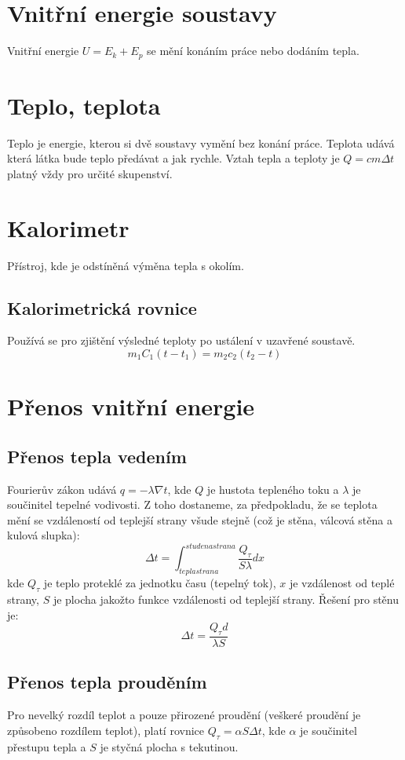\documentclass[titlepage]{report}
\begin{document}
\section{Vnitřní energie soustavy}
Vnitřní energie $U = E_k + E_p$ se mění konáním práce nebo dodáním tepla.
\section{Teplo, teplota}
Teplo je energie, kterou si dvě soustavy vymění bez konání práce. Teplota udává která látka bude teplo předávat a jak rychle. Vztah tepla a teploty je $Q = cm\Delta t$ platný vždy pro určité skupenství.
\section{Kalorimetr}
Přístroj, kde je odstíněná výměna tepla s okolím.
\subsection{Kalorimetrická rovnice}
Používá se pro zjištění výsledné teploty po ustálení v uzavřené soustavě.\\
\begin{equation}
m_1C_1(t-t_1) = m_2c_2(t_2-t)
\end{equation}
\section{Přenos vnitřní energie}
\subsection{Přenos tepla vedením}
Fourierův zákon udává $q = -\lambda \nabla t$, kde $Q$ je hustota tepleného toku a $\lambda$ je součinitel tepelné vodivosti. Z toho dostaneme, za předpokladu, že se teplota mění se vzdáleností od teplejší strany všude stejně (což je stěna, válcová stěna a kulová slupka):
\begin{equation}
\Delta t = \int_{tepla strana}^{studena strana} \frac{Q_{\tau}}{S \lambda} dx
\end{equation}
kde $Q_{\tau}$ je teplo proteklé za jednotku času (tepelný tok), $x$ je vzdálenost od teplé strany, $S$ je plocha jakožto funkce vzdálenosti od teplejší strany. Řešení pro stěnu je:
\begin{equation}
\Delta t = \frac{Q_{\tau}d}{\lambda S}
\end{equation}
\subsection{Přenos tepla prouděním}
Pro nevelký rozdíl teplot a pouze přirozené proudění (veškeré proudění je způsobeno rozdílem teplot), platí rovnice $Q_{\tau} = \alpha S \Delta t$, kde $\alpha$ je součinitel přestupu tepla a $S$ je styčná plocha s tekutinou.
\end{document}
